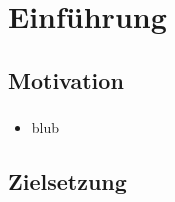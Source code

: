 \section{Einführung}


\subsection{Motivation}

\begin{frame}
    \frametitle{\insertsubsection} 

    \begin{itemize}[<+->]
        \item blub
    \end{itemize}
\end{frame}


\subsection{Zielsetzung}
